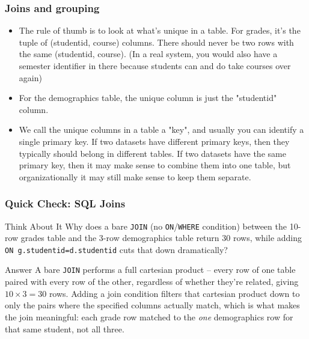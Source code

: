 \begin{frame}[fragile] \frametitle{Joins and grouping}
\begin{itemize}
\item The rule of thumb is to look at what's unique in a table. For grades, it's the tuple of (studentid, course) columns. There should never be two rows with the same (studentid, course). (In a real system, you would also have a semester identifier in there because students can and do take courses over again)

\item For the demographics table, the unique column is just the "studentid" column.

\item We call the unique columns in a table a "key", and usually you can identify a single primary key. If two datasets have different primary keys, then they typically should belong in different tables. If two datasets have the same primary key, then it may make sense to combine them into one table, but organizationally it may still make sense to keep them separate.
\end{itemize}
\end{frame}

\begin{frame}[fragile] \frametitle{Quick Check: SQL Joins}
\begin{block}{Think About It}
Why does a bare \lstinline|JOIN| (no \lstinline|ON|/\lstinline|WHERE| condition) between the
10-row grades table and the 3-row demographics table return 30 rows, while adding
\lstinline|ON g.studentid=d.studentid| cuts that down dramatically?
\end{block}
\pause
\begin{block}{Answer}
A bare \lstinline|JOIN| performs a full cartesian product -- every row of one table paired with
every row of the other, regardless of whether they're related, giving $10 \times 3 = 30$ rows.
Adding a join condition filters that cartesian product down to only the pairs where the
specified columns actually match, which is what makes the join meaningful: each grade row
matched to the \emph{one} demographics row for that same student, not all three.
\end{block}
\end{frame}


